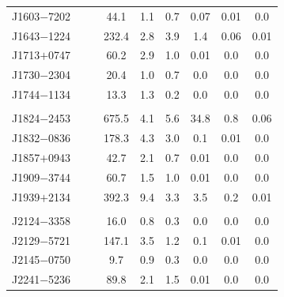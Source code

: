 \documentclass[useAMS,usenatbib]{mn2e}
\begin{document}
\begin{table}
\begin{center}
\begin{tabular}{lcccccccc}
J1603$-$7202&         &                   & 44.1     & 1.1       & 0.7         &  0.07    &  0.01             &  0.0      \\ 
J1643$-$1224&         &                   & 232.4    & 2.8       & 3.9         &  1.4     &  0.06             &  0.01      \\ 
J1713$+$0747&         &                   & 60.2     & 2.9       & 1.0         &  0.01    &  0.0              &  0.0      \\ 
J1730$-$2304&         &                   & 20.4     & 1.0       & 0.7         &  0.0     &  0.0              &  0.0      \\ 
%
%
J1744$-$1134&         &                   & 13.3     & 1.3       & 0.2         &  0.0     &  0.0              &  0.0      \\ 
            &         &                   &          &           &             &          &                   &           \\
J1824$-$2453&         &                   & 675.5    & 4.1       & 5.6         &  34.8    &  0.8              &  0.06     \\ 
J1832$-$0836&         &                   & 178.3    & 4.3       & 3.0         &  0.1     &  0.01             &  0.0      \\ 
J1857$+$0943&         &                   & 42.7     & 2.1       & 0.7         &  0.01    &  0.0              &  0.0      \\ 
J1909$-$3744&         &                   & 60.7     & 1.5       & 1.0         &  0.01    &  0.0              &  0.0      \\ 
J1939$+$2134&         &                   & 392.3    & 9.4       & 3.3         &  3.5     &  0.2              &  0.01     \\ 
            &         &                   &          &           &             &          &                   &           \\
J2124$-$3358&         &                   & 16.0     & 0.8       & 0.3         &  0.0     &  0.0              &  0.0   \\ 
J2129$-$5721&         &                   & 147.1    & 3.5       & 1.2         &  0.1     &  0.01             &  0.0   \\ 
J2145$-$0750&         &                   & 9.7      & 0.9       & 0.3         &  0.0     &  0.0              &  0.0   \\ 
J2241$-$5236&         &                   & 89.8     & 2.1       & 1.5         &  0.01    &  0.0              &  0.0  \\ 
%
\hline
\end{tabular}
\end{center}
\end{table}
	
\end{document}
